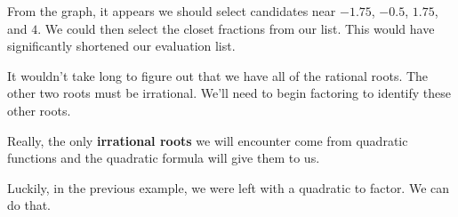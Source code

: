 \documentclass{ximera}
\begin{document}
\begin{center}
\end{center}


From the graph, it appears we should select candidates near $-1.75$, $-0.5$, $1.75$, and $4$. We could then select the closet fractions from our list. This would have significantly shortened our evaluation list.  

It wouldn't take long to figure out that we have all of the rational roots. The other two roots must be irrational.  We'll need to begin factoring to identify these other roots. 



Really, the only \textbf{\textcolor{blue!55!black}{irrational roots}} we will encounter come from quadratic functions and the quadratic formula will give them to us.


Luckily, in the previous example, we were left with a quadratic to factor.  We can do that.
\end{document}
